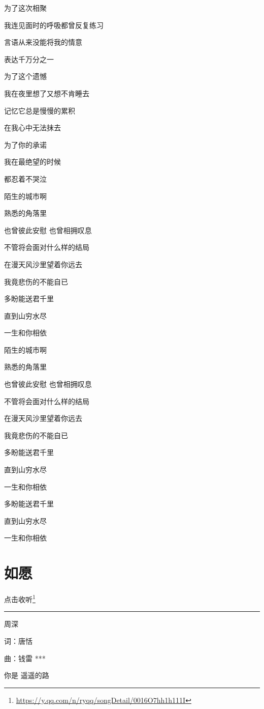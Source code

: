 \documentclass[]{ctexbook}
\renewcommand{\href}[2]{#2\footnote{\url{#1}}}
\begin{document}
为了这次相聚

我连见面时的呼吸都曾反复练习

言语从来没能将我的情意

表达千万分之一

为了这个遗憾

我在夜里想了又想不肯睡去

记忆它总是慢慢的累积

在我心中无法抹去

为了你的承诺

我在最绝望的时候

都忍着不哭泣

陌生的城市啊

熟悉的角落里

也曾彼此安慰 也曾相拥叹息

不管将会面对什么样的结局

在漫天风沙里望着你远去

我竟悲伤的不能自已

多盼能送君千里

直到山穷水尽

一生和你相依

陌生的城市啊

熟悉的角落里

也曾彼此安慰 也曾相拥叹息

不管将会面对什么样的结局

在漫天风沙里望着你远去

我竟悲伤的不能自已

多盼能送君千里

直到山穷水尽

一生和你相依

多盼能送君千里

直到山穷水尽

一生和你相依

\section*{如愿}\label{achieve-wishes}


\href{https://y.qq.com/n/ryqq/songDetail/0016O7hh1h111I}{点击收听}

\begin{center}\rule{0.5\linewidth}{0.5pt}\end{center}

周深

词：唐恬

曲：钱雷
***

你是 遥遥的路
\end{document}
